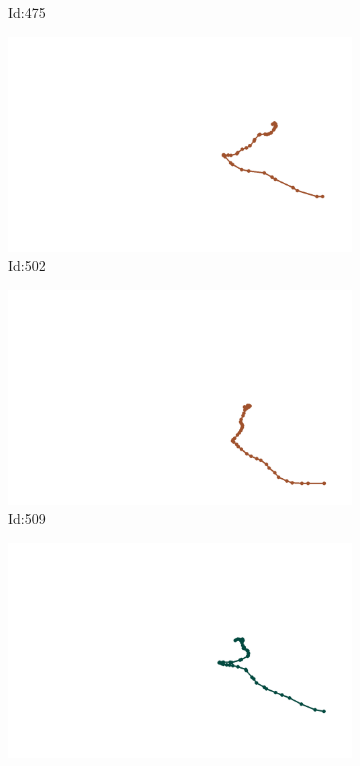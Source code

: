 \documentclass[12pt,twoside]{report}
\begin{document}
\begin{figure}
\begin{subfigure}[b]{0.20\textwidth}
\caption{Id:475}
\end{subfigure}
\begin{subfigure}[b]{0.20\textwidth}
\centering
\includegraphics[width=\textwidth]{../trajectories/502.png}
\caption{Id:502}
\end{subfigure}
\begin{subfigure}[b]{0.20\textwidth}
\centering
\includegraphics[width=\textwidth]{../trajectories/509.png}
\caption{Id:509}
\end{subfigure}
\begin{subfigure}[b]{0.20\textwidth}
\centering
\includegraphics[width=\textwidth]{../trajectories/531.png}

\end{subfigure}
\end{figure}
\end{document}
